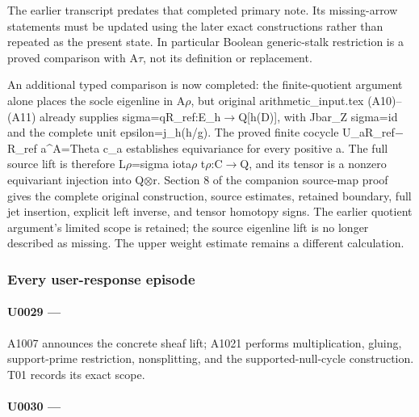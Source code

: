 The earlier transcript predates that completed primary note. Its
missing-arrow statements must be updated using the later exact
constructions rather than repeated as the present state. In particular
Boolean generic-stalk restriction is a proved comparison with
A\allowbreak{}\ensuremath{τ}\allowbreak{}, not its definition or
replacement.

An additional typed comparison is now completed: the finite-quotient
argument alone places the socle eigenline in
A\allowbreak{}\ensuremath{ρ}\allowbreak{}, but original
arithmetic\_input.tex (A10)--(A11) already supplies
sigma=qR\_ref:E\_h\allowbreak{}\ensuremath{→}\allowbreak{}Q[h(D)], with
Jbar\_Z sigma=id and the complete unit epsilon=j\_h(h/g). The proved
finite cocycle U\_aR\_ref\allowbreak{}\ensuremath{−}\allowbreak{}R\_ref
a\^{}A=Theta c\_a establishes equivariance for every positive a. The
full source lift is therefore
L\allowbreak{}\ensuremath{ρ}\allowbreak{}=sigma
iota\allowbreak{}\ensuremath{ρ}\allowbreak{}
t\allowbreak{}\ensuremath{ρ}\allowbreak{}:C\allowbreak{}\ensuremath{→}\allowbreak{}Q,
and its tensor is a nonzero equivariant injection into
Q\allowbreak{}\ensuremath{⊗}\allowbreak{}r. Section 8 of the companion
source-map proof gives the complete original construction, source
estimates, retained boundary, full jet insertion, explicit left inverse,
and tensor homotopy signs. The earlier quotient argument's limited scope
is retained; the source eigenline lift is no longer described as
missing. The upper weight estimate remains a different calculation.

\subsubsection{Every user-response
episode}\label{every-user-response-episode}

\paragraph{\texorpdfstring{U0029 ---
\protect{}}{U0029 --- }}\label{u0029-53352f69-6c38-4cab-a6aa-c225647ebe9a}

A1007 announces the concrete sheaf lift; A1021 performs multiplication,
gluing, support-prime restriction, nonsplitting, and the
supported-null-cycle construction. T01 records its exact scope.

\paragraph{\texorpdfstring{U0030 ---
\protect{}}{U0030 --- }}\label{u0030-2e3cac15-6cbf-4fbd-b826-ceed04867399}

